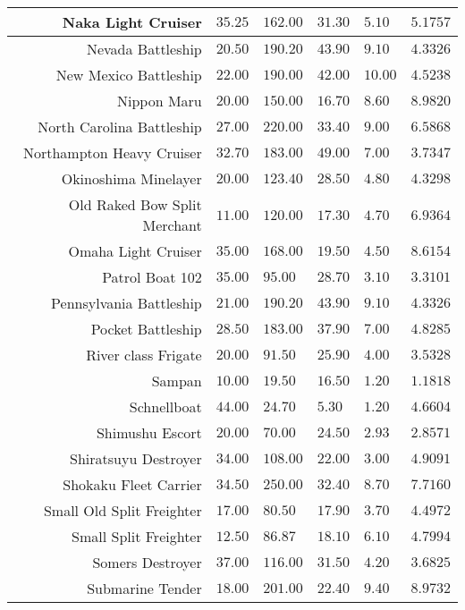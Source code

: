\begin{tabularx}{\textwidth}{|r|l|l|l|l|X|}
\hline
Naka Light Cruiser & $35.25$ & $162.00$ & $31.30$ & $5.10$ & $5.1757$ \\
\hline
Nevada Battleship & $20.50$ & $190.20$ & $43.90$ & $9.10$ & $4.3326$ \\
\hline
New Mexico Battleship & $22.00$ & $190.00$ & $42.00$ & $10.00$ & $4.5238$ \\
\hline
Nippon Maru & $20.00$ & $150.00$ & $16.70$ & $8.60$ & $8.9820$ \\
\hline
North Carolina Battleship & $27.00$ & $220.00$ & $33.40$ & $9.00$ & $6.5868$ \\
\hline
Northampton Heavy Cruiser & $32.70$ & $183.00$ & $49.00$ & $7.00$ & $3.7347$ \\
\hline
Okinoshima Minelayer & $20.00$ & $123.40$ & $28.50$ & $4.80$ & $4.3298$ \\
\hline
Old Raked Bow Split Merchant & $11.00$ & $120.00$ & $17.30$ & $4.70$ & $6.9364$ \\
\hline
Omaha Light Cruiser & $35.00$ & $168.00$ & $19.50$ & $4.50$ & $8.6154$ \\
\hline
Patrol Boat 102 & $35.00$ & $95.00$ & $28.70$ & $3.10$ & $3.3101$ \\
\hline
Pennsylvania Battleship & $21.00$ & $190.20$ & $43.90$ & $9.10$ & $4.3326$ \\
\hline
Pocket Battleship & $28.50$ & $183.00$ & $37.90$ & $7.00$ & $4.8285$ \\
\hline
River class Frigate & $20.00$ & $91.50$ & $25.90$ & $4.00$ & $3.5328$ \\
\hline
Sampan & $10.00$ & $19.50$ & $16.50$ & $1.20$ & $1.1818$ \\
\hline
Schnellboat & $44.00$ & $24.70$ & $5.30$ & $1.20$ & $4.6604$ \\
\hline
Shimushu Escort & $20.00$ & $70.00$ & $24.50$ & $2.93$ & $2.8571$ \\
\hline
Shiratsuyu Destroyer & $34.00$ & $108.00$ & $22.00$ & $3.00$ & $4.9091$ \\
\hline
Shokaku Fleet Carrier & $34.50$ & $250.00$ & $32.40$ & $8.70$ & $7.7160$ \\
\hline
Small Old Split Freighter & $17.00$ & $80.50$ & $17.90$ & $3.70$ & $4.4972$ \\
\hline
Small Split Freighter & $12.50$ & $86.87$ & $18.10$ & $6.10$ & $4.7994$ \\
\hline
Somers Destroyer & $37.00$ & $116.00$ & $31.50$ & $4.20$ & $3.6825$ \\
\hline
Submarine Tender & $18.00$ & $201.00$ & $22.40$ & $9.40$ & $8.9732$ \\

\end{tabularx}
